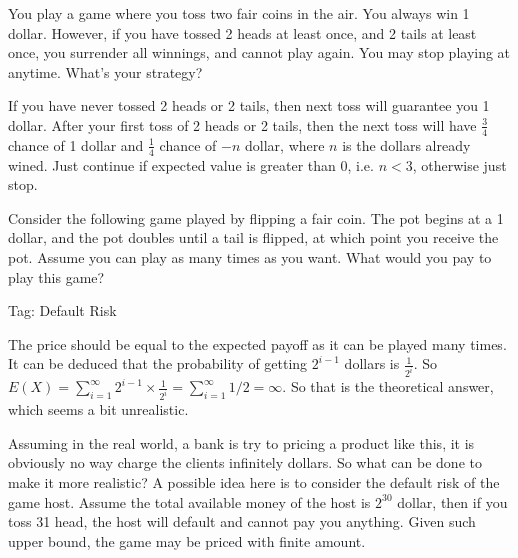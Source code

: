 \begin{exe}
You play a game where you toss two fair coins in the air. You always win 1 dollar. However, if you have tossed 2 heads at least once, and 2 tails at least once, you surrender all winnings, and cannot play again. You may stop playing at anytime. What's your strategy?
\end{exe}
\begin{teacher}
\begin{sol}
If you have never tossed 2 heads or 2 tails, then next toss will guarantee you 1 dollar. After your first toss of 2 heads or 2 tails, then the next toss will have $\frac{3}{4}$ chance of 1 dollar and $\frac{1}{4}$ chance of $-n$ dollar, where $n$ is the dollars already wined. Just continue if expected value is greater than 0, i.e. $n<3$, otherwise just stop.
\end{sol}
\end{teacher}

\begin{exe}
Consider the following game played by flipping a fair coin. The pot begins at a 1 dollar, and the pot doubles until a tail is flipped, at which point you receive the pot. Assume you can play as many times as you want. What would you pay to play this game?
\end{exe}
\begin{teacher}
Tag: Default Risk
\begin{sol}
The price should be equal to the expected payoff as it can be played many times. It can be deduced that the probability of getting $2^{i-1}$ dollars is $\frac{1}{2^i}$. So $E(X) = \sum_{i=1}^{\infty} 2^{i-1}\times\frac{1}{2^i}=\sum_{i=1}^{\infty} 1/2=\infty$. So that is the theoretical answer, which seems a bit unrealistic.

Assuming in the real world, a bank is try to pricing a product like this, it is obviously no way charge the clients infinitely dollars. So what can be done to make it more realistic? A possible idea here is to consider the default risk of the game host. Assume the total available money of the host is $2^30$ dollar, then if you toss 31 head, the host will default and cannot pay you anything. Given such upper bound, the game may be priced with finite amount.
\end{sol}
\end{teacher}

